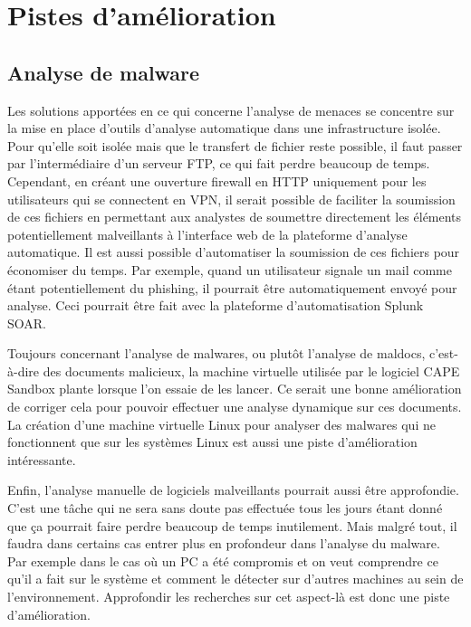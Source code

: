 
\chapter{Pistes d'amélioration}





\section{Analyse de malware}

Les solutions apportées en ce qui concerne l'analyse de menaces se concentre sur la mise en place d'outils d'analyse automatique dans une infrastructure isolée. Pour qu'elle soit isolée mais que le transfert de fichier reste possible, il faut passer par l'intermédiaire d'un serveur FTP, ce qui fait perdre beaucoup de temps. Cependant, en créant une ouverture firewall en HTTP uniquement pour les utilisateurs qui se connectent en VPN, il serait possible de faciliter la soumission de ces fichiers en permettant aux analystes de soumettre directement les éléments potentiellement malveillants à l'interface web de la plateforme d'analyse automatique. Il est aussi possible d'automatiser la soumission de ces fichiers pour économiser du temps. Par exemple, quand un utilisateur signale un mail comme étant potentiellement du phishing, il pourrait être automatiquement envoyé pour analyse. Ceci pourrait être fait avec la plateforme d'automatisation Splunk SOAR.

Toujours concernant l'analyse de malwares, ou plutôt l'analyse de maldocs, c'est-à-dire des documents malicieux, la machine virtuelle utilisée par le logiciel CAPE Sandbox plante lorsque l'on essaie de les lancer. Ce serait une bonne amélioration de corriger cela pour pouvoir effectuer une analyse dynamique sur ces documents. La création d'une machine virtuelle Linux pour analyser des malwares qui ne fonctionnent que sur les systèmes Linux est aussi une piste d'amélioration intéressante.

Enfin, l'analyse manuelle de logiciels malveillants pourrait aussi être approfondie. C'est une tâche qui ne sera sans doute pas effectuée tous les jours étant donné que ça pourrait faire perdre beaucoup de temps inutilement. Mais malgré tout, il faudra dans certains cas entrer plus en profondeur dans l'analyse du malware. Par exemple dans le cas où un PC a été compromis et on veut comprendre ce qu'il a fait sur le système et comment le détecter sur d'autres machines au sein de l'environnement. Approfondir les recherches sur cet aspect-là est donc une piste d'amélioration.





